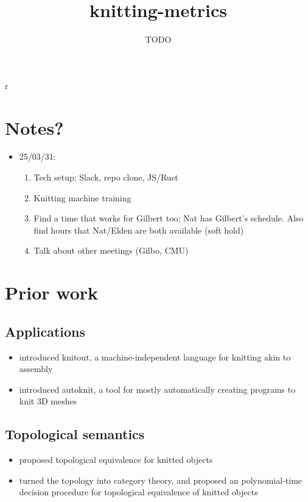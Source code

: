r\documentclass[acmsmall,screen,review,anonymous,nonacm]{acmart}
\title{knitting-metrics}
\author{TODO}
\begin{document}
\maketitle

\section{Notes?}

\begin{itemize}
    \item 25/03/31: \begin{enumerate}
            \item Tech setup: Slack, repo clone, JS/Rust
            \item Knitting machine training
            \item Find a time that works for Gilbert too; Nat has Gilbert's schedule. Also
                find hours that Nat/Elden are both available (soft hold)
            \item Talk about other meetings (Gilbo, CMU)
    \end{enumerate}
    
\end{itemize}

\section{Prior work}
\subsection{Applications}
\begin{itemize}
    \item \citet{McCann2016} introduced knitout, a machine-independent
    language for knitting akin to assembly
    \item \citet{2018-autoknit} introduced autoknit, a tool
    for mostly automatically creating programs to knit 3D meshes
\end{itemize}

\subsection{Topological semantics}
\begin{itemize}
    \item \citet{Lin2023} proposed topological equivalence
    for knitted objects
    \item \citet{Hurtig2025} turned the topology into
    category theory, and proposed an polynomial-time
    decision procedure for topological equivalence of
    knitted objects
\end{itemize}
\end{document}
